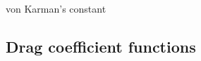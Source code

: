 \documentclass[letterpaper,10pt,english]{sphinxmanual}
\begin{document}

\begin{fulllineitems}
\label{\detokenize{index:util_subs.kappa}}
von Karman's constant

\end{fulllineitems}


\subsection{Drag coefficient functions}
\label{\detokenize{index:drag-coefficient-functions}}
\label{\detokenize{index:module-flux_subs}}

\end{document}
